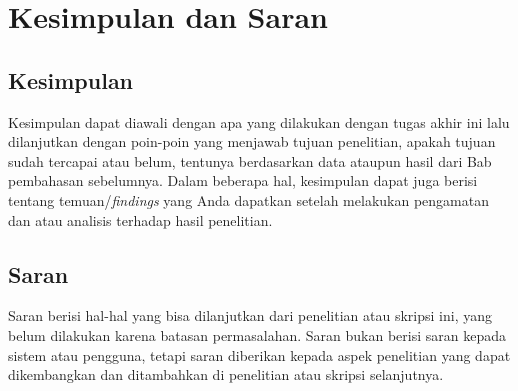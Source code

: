 \chapter{Kesimpulan dan Saran}

\section{Kesimpulan}

Kesimpulan dapat diawali dengan apa yang dilakukan dengan tugas akhir ini lalu 
dilanjutkan dengan poin-poin yang menjawab tujuan penelitian, apakah tujuan sudah tercapai atau belum, tentunya berdasarkan data ataupun hasil dari Bab pembahasan sebelumnya. Dalam beberapa hal, kesimpulan dapat juga berisi tentang temuan/\textit{findings} yang Anda dapatkan setelah melakukan pengamatan dan atau analisis terhadap hasil penelitian. 

\section{Saran}

Saran berisi hal-hal yang bisa dilanjutkan dari penelitian atau skripsi ini, yang belum dilakukan karena batasan permasalahan. Saran bukan berisi saran kepada sistem atau pengguna, tetapi saran diberikan kepada aspek penelitian yang dapat dikembangkan dan ditambahkan di penelitian atau skripsi selanjutnya.
